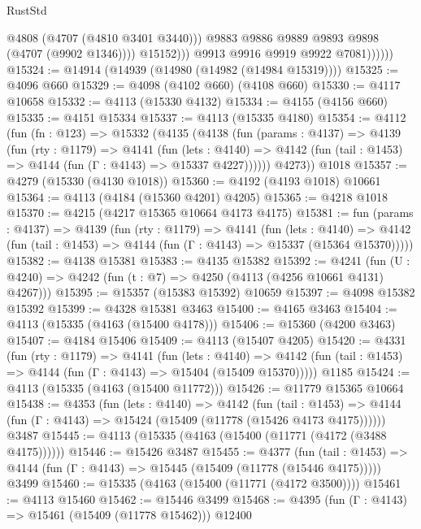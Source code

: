 \begin{lexlean}{RustStd}
\begin{coremodule}
                            @4808
                            (@4707 (@4810 @3401 @3440)))
                          @9883
                          @9886
                          @9889
                          @9893
                          @9898
                          (@4707 (@9902 @1346))))
                      @15152)))
                @9913
                @9916
                @9919
                @9922
                @7081))))))
@15324 := @14914 (@14939 (@14980 (@14982 (@14984 @15319))))
@15325 := @4096 @660
@15329 := @4098 (@4102 @660) (@4108 @660)
@15330 := @4117 @10658
@15332 := @4113 (@15330 @4132)
@15334 := @4155 (@4156 @660)
@15335 := @4151 @15334
@15337 := @4113 (@15335 @4180)
@15354 := @4112
    (fun (fn : @123) =>
    @15332
      (@4135
        (@4138
          (fun (params : @4137) =>
          @4139
            (fun (rty : @1179) =>
            @4141
              (fun (lets : @4140) =>
              @4142 (fun (tail : @1453) => @4144 (fun (Γ : @4143) => @15337 @4227))))))
        @4273))
    @1018
@15357 := @4279 (@15330 (@4130 @1018))
@15360 := @4192 (@4193 @1018) @10661
@15364 := @4113 (@4184 (@15360 @4201) @4205)
@15365 := @4218 @1018
@15370 := @4215 (@4217 @15365 @10664 @4173 @4175)
@15381 := fun (params : @4137) =>
  @4139
    (fun (rty : @1179) =>
    @4141
      (fun (lets : @4140) =>
      @4142 (fun (tail : @1453) => @4144 (fun (Γ : @4143) => @15337 (@15364 @15370)))))
@15382 := @4138 @15381
@15383 := @4135 @15382
@15392 := @4241
    (fun (U : @4240) => @4242 (fun (t : @7) => @4250 (@4113 (@4256 @10661 @4131) @4267)))
@15395 := @15357 (@15383 @15392) @10659
@15397 := @4098 @15382 @15392
@15399 := @4328 @15381 @3463
@15400 := @4165 @3463
@15404 := @4113 (@15335 (@4163 (@15400 @4178)))
@15406 := @15360 (@4200 @3463)
@15407 := @4184 @15406
@15409 := @4113 (@15407 @4205)
@15420 := @4331
    (fun (rty : @1179) =>
    @4141
      (fun (lets : @4140) =>
      @4142 (fun (tail : @1453) => @4144 (fun (Γ : @4143) => @15404 (@15409 @15370)))))
    @1185
@15424 := @4113 (@15335 (@4163 (@15400 @11772)))
@15426 := @11779 @15365 @10664
@15438 := @4353
    (fun (lets : @4140) =>
    @4142
      (fun (tail : @1453) =>
      @4144 (fun (Γ : @4143) => @15424 (@15409 (@11778 (@15426 @4173 @4175))))))
    @3487
@15445 := @4113 (@15335 (@4163 (@15400 (@11771 (@4172 (@3488 @4175))))))
@15446 := @15426 @3487
@15455 := @4377
    (fun (tail : @1453) => @4144 (fun (Γ : @4143) => @15445 (@15409 (@11778 (@15446 @4175)))))
    @3499
@15460 := @15335 (@4163 (@15400 (@11771 (@4172 @3500))))
@15461 := @4113 @15460
@15462 := @15446 @3499
@15468 := @4395 (fun (Γ : @4143) => @15461 (@15409 (@11778 @15462))) @12400

\end{coremodule}
\end{lexlean}

